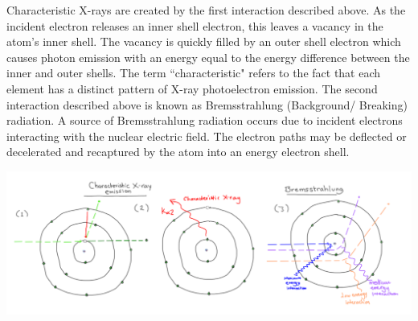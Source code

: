 \documentclass[10pt, a4paper, singlespacing]{report}
\newenvironment{Figure}
    {\par\medskip\noindent\minipage{\linewidth}}
    {\endminipage\par\medskip}
\begin{document}
Characteristic X-rays are created by the first interaction described above. As the incident electron releases an inner shell electron, this leaves a vacancy in the atom's inner shell. The vacancy is quickly filled by an outer shell electron which causes photon emission with an energy equal to the energy difference between the inner and outer shells. The term ``characteristic" refers to the fact that each element has a distinct pattern of X-ray photoelectron emission.
The second interaction described above is known as Bremsstrahlung (Background/ Breaking) radiation. A source of Bremsstrahlung radiation occurs due to incident electrons interacting with the nuclear electric field. The electron paths may be deflected or decelerated and recaptured by the atom into an energy electron shell. 
\begin{Figure}
\centering
\includegraphics[width=\linewidth]{characteristic_Bremsstrahlung.pdf}
\label{fig:1.3}
\end{Figure}
\end{document}
